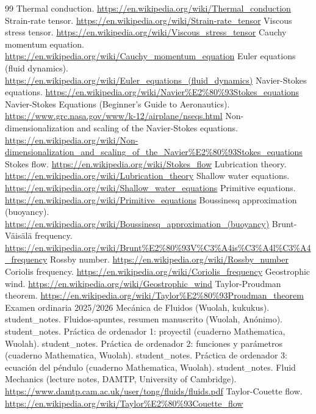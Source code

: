 \documentclass[10pt,openany]{book}
\begin{document}
\begin{thebibliography}{99}
 Thermal conduction. \url{https://en.wikipedia.org/wiki/Thermal_conduction}
 Strain-rate tensor. \url{https://en.wikipedia.org/wiki/Strain-rate_tensor}
 Viscous stress tensor. \url{https://en.wikipedia.org/wiki/Viscous_stress_tensor}
 Cauchy momentum equation. \url{https://en.wikipedia.org/wiki/Cauchy_momentum_equation}
 Euler equations (fluid dynamics). \url{https://en.wikipedia.org/wiki/Euler_equations_(fluid_dynamics)}
 Navier-Stokes equations. \url{https://en.wikipedia.org/wiki/Navier%E2%80%93Stokes_equations}
 Navier-Stokes Equations (Beginner's Guide to Aeronautics). \url{https://www.grc.nasa.gov/www/k-12/airplane/nseqs.html}
 Non-dimensionalization and scaling of the Navier-Stokes equations. \url{https://en.wikipedia.org/wiki/Non-dimensionalization_and_scaling_of_the_Navier%E2%80%93Stokes_equations}
 Stokes flow. \url{https://en.wikipedia.org/wiki/Stokes_flow}
 Lubrication theory. \url{https://en.wikipedia.org/wiki/Lubrication_theory}
 Shallow water equations. \url{https://en.wikipedia.org/wiki/Shallow_water_equations}
 Primitive equations. \url{https://en.wikipedia.org/wiki/Primitive_equations}
 Boussinesq approximation (buoyancy). \url{https://en.wikipedia.org/wiki/Boussinesq_approximation_(buoyancy)}
 Brunt-Väisälä frequency. \url{https://en.wikipedia.org/wiki/Brunt%E2%80%93V%C3%A4is%C3%A4l%C3%A4_frequency}
 Rossby number. \url{https://en.wikipedia.org/wiki/Rossby_number}
 Coriolis frequency. \url{https://en.wikipedia.org/wiki/Coriolis_frequency}
 Geostrophic wind. \url{https://en.wikipedia.org/wiki/Geostrophic_wind}
 Taylor-Proudman theorem. \url{https://en.wikipedia.org/wiki/Taylor%E2%80%93Proudman_theorem}
 Examen ordinaria 2025/2026 Mecánica de Fluidos (Wuolah, kukukus). student\_notes.
 Fluidos-apuntes, resumen manuscrito (Wuolah, Anónimo). student\_notes.
 Práctica de ordenador 1: proyectil (cuaderno Mathematica, Wuolah). student\_notes.
 Práctica de ordenador 2: funciones y parámetros (cuaderno Mathematica, Wuolah). student\_notes.
 Práctica de ordenador 3: ecuación del péndulo (cuaderno Mathematica, Wuolah). student\_notes.
 Fluid Mechanics (lecture notes, DAMTP, University of Cambridge). \url{https://www.damtp.cam.ac.uk/user/tong/fluids/fluids.pdf}
 Taylor-Couette flow. \url{https://en.wikipedia.org/wiki/Taylor%E2%80%93Couette_flow}

\end{thebibliography}
\end{document}
